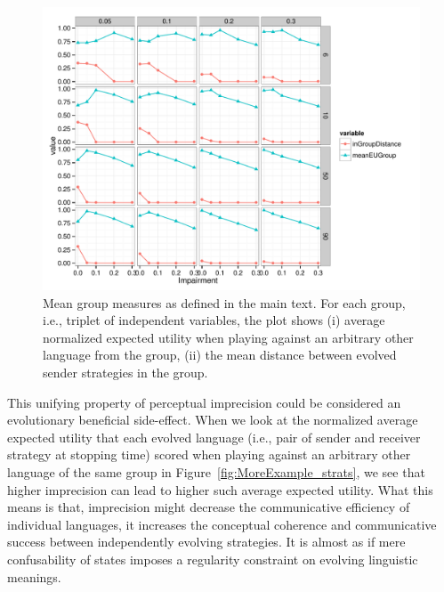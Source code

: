 \begin{figure}
  \centering

    \includegraphics[width=\textwidth]{plots/WithinGroupMeasures.pdf}

    \caption{Mean group measures as defined in the main text. For each
      group, i.e., triplet of independent variables, the plot shows
      (i) average normalized expected utility when playing against an
      arbitrary other language from the group, (ii) the mean distance
      between evolved sender strategies in the group.}
  \label{fig:AverageEUinGroups}
\end{figure}

This unifying property of perceptual imprecision could be considered
an evolutionary beneficial side-effect. When we look at the normalized
average expected utility that each evolved language (i.e., pair of
sender and receiver strategy at stopping time) scored when playing
against an arbitrary other language of the same group in
Figure~\ref{fig:MoreExample_strats}, we see that higher imprecision
can lead to higher such average expected utility. What this means is
that, imprecision might decrease the communicative efficiency of
individual languages, it increases the conceptual coherence and
communicative success between independently evolving strategies. It is
almost as if mere confusability of states imposes a regularity
constraint on evolving linguistic meanings.




